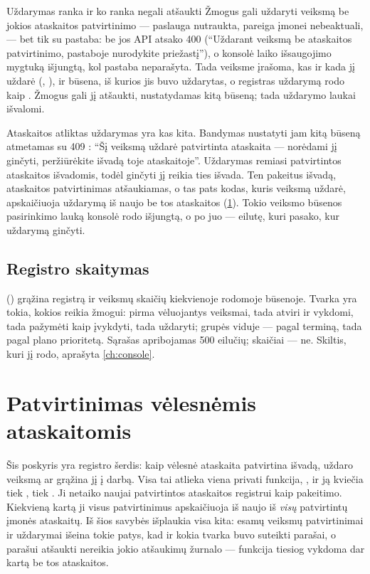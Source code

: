 \begin{humanbox}{Uždarymas ranka ir ko ranka negali atšaukti}
Žmogus gali uždaryti veiksmą be jokios ataskaitos patvirtinimo --- paslauga nutraukta, pareiga
įmonei nebeaktuali, --- bet tik su pastaba: be jos API atsako 400 
(\enquote{Uždarant veiksmą be ataskaitos patvirtinimo, pastaboje nurodykite priežastį}), o
konsolė laiko išsaugojimo mygtuką išjungtą, kol pastaba neparašyta. Tada veiksme įrašoma, kas ir
kada jį uždarė (, ), ir būsena, iš kurios jis buvo uždarytas, o
registras uždarymą rodo kaip . Žmogus gali jį atšaukti, nustatydamas kitą būseną;
tada uždarymo laukai išvalomi.

\smallskip
Ataskaitos atliktas uždarymas yra kas kita. Bandymas nustatyti jam kitą būseną atmetamas su 409
: \enquote{Šį veiksmą uždarė patvirtinta ataskaita --- norėdami jį
ginčyti, peržiūrėkite išvadą toje ataskaitoje}. Uždarymas remiasi patvirtintos ataskaitos
išvadomis, todėl ginčyti jį reikia ties išvada. Ten pakeitus išvadą, ataskaitos patvirtinimas
atšaukiamas, o tas pats kodas, kuris veiksmą uždarė, apskaičiuoja uždarymą iš naujo be tos
ataskaitos (\cref{sec:register:settle}). Tokio veiksmo būsenos pasirinkimo lauką konsolė rodo išjungtą,
o po juo --- eilutę, kuri pasako, kur uždarymą ginčyti.
\end{humanbox}

\subsection{Registro skaitymas}

 () grąžina registrą ir veiksmų
skaičių kiekvienoje rodomoje būsenoje. Tvarka yra tokia, kokios reikia žmogui: pirma vėluojantys
veiksmai, tada atviri ir vykdomi, tada pažymėti kaip įvykdyti, tada uždaryti; grupės viduje ---
pagal terminą, tada pagal plano prioritetą. Sąrašas apribojamas 500 eilučių; skaičiai ---
ne. Skiltis, kuri jį rodo, aprašyta \cref{ch:console}.


\section{Patvirtinimas vėlesnėmis ataskaitomis}\label{sec:register:settle}

Šis poskyris yra registro šerdis: kaip vėlesnė ataskaita patvirtina išvadą, uždaro veiksmą ar
grąžina jį į darbą. Visa tai atlieka viena privati funkcija, , ir ją kviečia tiek , tiek . Ji netaiko naujai patvirtintos
ataskaitos registrui kaip pakeitimo. Kiekvieną kartą ji visus patvirtinimus apskaičiuoja iš
naujo iš \emph{visų} patvirtintų įmonės ataskaitų. Iš šios savybės išplaukia visa kita: esamų
veiksmų patvirtinimai ir uždarymai išeina tokie patys, kad ir kokia tvarka buvo suteikti parašai,
o parašui atšaukti nereikia jokio atšaukimų žurnalo --- funkcija tiesiog vykdoma dar kartą be tos ataskaitos.

